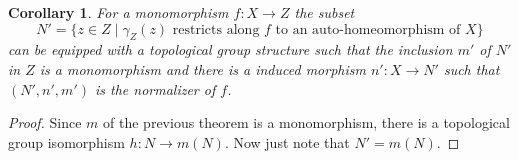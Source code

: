 \documentclass{article}
\newtheorem{corollary}[theorem]{Corollary}
\begin{document}
\begin{corollary}\label{corollary:normalizer}
For a monomorphism $f:X\to Z$ the subset
\[N'=\{z\in Z\mid \gamma_Z(z) \text{ restricts along $f$ to an auto-homeomorphism of $X$}\}\]
can be equipped with a topological group structure such that the inclusion
$m'$ of $N'$ in $Z$ is a monomorphism and there is a induced morphism $n':X\to N'$
such that $(N',n',m')$ is the normalizer of $f$.
\end{corollary}
\begin{proof}
Since $m$ of the previous theorem is a monomorphism, there is 
a topological group isomorphism $h:N\to m(N)$. Now just note that $N'=m(N)$.
\end{proof}
{}
\end{document}
